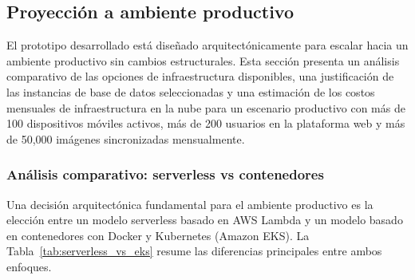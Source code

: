 \newpage
\subsection{Proyección a ambiente productivo}
\label{subsec:produccion}

El prototipo desarrollado está diseñado arquitectónicamente para escalar
hacia un ambiente productivo sin cambios estructurales. Esta sección
presenta un análisis comparativo de las opciones de infraestructura
disponibles, una justificación de las instancias de base de datos
seleccionadas y una estimación de los costos mensuales de infraestructura
en la nube para un escenario productivo con más de 100 dispositivos
móviles activos, más de 200 usuarios en la plataforma web y más de
50,000 imágenes sincronizadas mensualmente.

\subsubsection*{Análisis comparativo: serverless vs contenedores}

Una decisión arquitectónica fundamental para el ambiente productivo es
la elección entre un modelo serverless basado en AWS Lambda y un modelo
basado en contenedores con Docker y Kubernetes (Amazon EKS). La
Tabla~\ref{tab:serverless_vs_eks} resume las diferencias principales
entre ambos enfoques.

